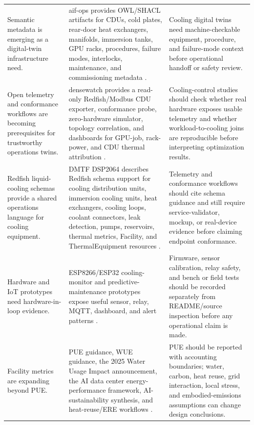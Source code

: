 \documentclass[11pt]{article}
\begin{document}
\begin{table}[t]
\begin{tabularx}{\textwidth}{p{}X X}
\addlinespace
Semantic metadata is emerging as a digital-twin infrastructure need. & aif-ops provides OWL/SHACL artifacts for CDUs, cold plates, rear-door heat exchangers, manifolds, immersion tanks, GPU racks, procedures, failure modes, interlocks, maintenance, and commissioning metadata \cite{VisumAIFOps2026}. & Cooling digital twins need machine-checkable equipment, procedure, and failure-mode context before operational handoff or safety review. \\
\addlinespace
Open telemetry and conformance workflows are becoming prerequisites for trustworthy operations twins. & densewatch provides a read-only Redfish/Modbus CDU exporter, conformance probe, zero-hardware simulator, topology correlation, and dashboards for GPU-job, rack-power, and CDU thermal attribution \cite{Densewatch2026}. & Cooling-control studies should check whether real hardware exposes usable telemetry and whether workload-to-cooling joins are reproducible before interpreting optimization results. \\
\addlinespace
Redfish liquid-cooling schemas provide a shared operations language for cooling equipment. & DMTF DSP2064 describes Redfish schema support for cooling distribution units, immersion cooling units, heat exchangers, cooling loops, coolant connectors, leak detection, pumps, reservoirs, thermal metrics, Facility, and ThermalEquipment resources \cite{DMTFRedfishLiquidCooling2025}. & Telemetry and conformance workflows should cite schema guidance and still require service-validator, mockup, or real-device evidence before claiming endpoint conformance. \\
\addlinespace
Hardware and IoT prototypes need hardware-in-loop evidence. & ESP8266/ESP32 cooling-monitor and predictive-maintenance prototypes expose useful sensor, relay, MQTT, dashboard, and alert patterns \cite{SohelSmartIoTCooling2026,CoolingFanPredictiveMaintenanceTwin2026}. & Firmware, sensor calibration, relay safety, and bench or field tests should be recorded separately from README/source inspection before any operational claim is made. \\
\addlinespace
Facility metrics are expanding beyond PUE. & PUE guidance, WUE guidance, the 2025 Water Usage Impact announcement, the AI data center energy-performance framework, AI-sustainability synthesis, and heat-reuse/ERE workflows \cite{GreenGridPUE2012,GreenGridWUE2011,GreenGridWUI2025,ASHRAEAIDCFramework2026,ChienAISustainability2026}. & PUE should be reported with accounting boundaries; water, carbon, heat reuse, grid interaction, local stress, and embodied-emissions assumptions can change design conclusions. \\

\end{tabularx}
\end{table}
\end{document}
